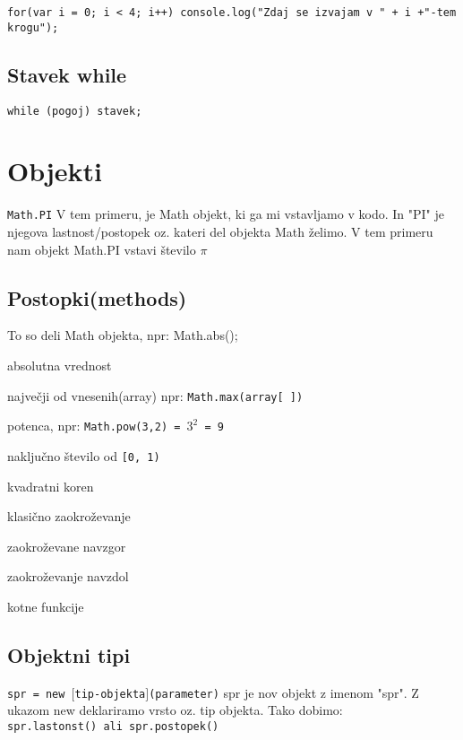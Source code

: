 \begin{verbatim}
for(var i = 0; i < 4; i++) console.log("Zdaj se izvajam v " + i +"-tem krogu");
\end{verbatim}

\subsection{Stavek while}

\texttt{while (pogoj) stavek;}
\newpage

\section{Objekti}

\texttt{Math.PI}
V tem primeru, je Math objekt, ki ga mi vstavljamo v kodo. In "PI" je njegova lastnost/postopek oz. kateri del objekta Math želimo. V tem primeru nam objekt Math.PI vstavi število $\pi$


\subsection{Postopki(methods)}
To so deli Math objekta, npr: Math.abs();
\begin{description}[align=left, labelwidth=2cm]
	\item[abs()] absolutna vrednost
	\item[max()] največji od vnesenih(array) npr: \texttt{Math.max(array[ ])}
	\item[pow()] potenca, npr: \texttt{Math.pow(3,2) = $3^2$ = 9}
	
	\item[random()] naključno število od \texttt{[0, 1)}
	\item[sqrt()] kvadratni koren
	\item[round()] klasično zaokroževanje
	\item[ceil()] zaokroževane navzgor
	\item[floor()] zaokroževanje navzdol
	\item[sin(), cos(), tan()] kotne funkcije
\end{description}

\subsection{Objektni tipi}

\texttt{spr = new $[$tip-objekta$]$(parameter)}
spr je nov objekt z imenom "spr". Z ukazom new deklariramo vrsto oz. tip objekta. Tako dobimo:\\
\texttt{spr.lastonst() ali spr.postopek()}

